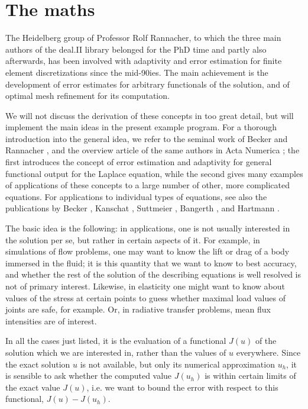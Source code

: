 \documentclass{article}
\begin{document}
\section{The maths}

The Heidelberg group of Professor Rolf Rannacher, to which the three main
authors of the deal.II library belonged for the PhD time and partly also
afterwards, has been involved with adaptivity and error estimation for finite
element discretizations since the mid-90ies. The main achievement is the
development of error estimates for arbitrary functionals of the solution, and
of optimal mesh refinement for its computation.

We will not discuss the derivation of these concepts in too great detail, but
will implement the main ideas in the present example program. For a thorough
introduction into the general idea, we refer to the seminal work of Becker and
Rannacher \cite{BR95,BR96r}, and the overview article of the same authors in
Acta Numerica \cite{BR01}; the first introduces the concept of error
estimation and adaptivity for general functional output for the Laplace
equation, while the second gives many examples of applications of these
concepts to a large number of other, more complicated equations. For
applications to individual types of equations, see also the publications by
Becker \cite{Bec95,Bec98}, Kanschat \cite{Kan96,FK97}, Suttmeier
\cite{Sut96,RS97,RS98c,RS99}, Bangerth \cite{BR99b,Ban00w,BR01a,Ban02}, and
Hartmann \cite{HH01,HH01a,HH01b}.

The basic idea is the following: in applications, one is not usually
interested in the solution per se, but rather in certain aspects of it. For
example, in simulations of flow problems, one may want to know the lift or
drag of a body immersed in the fluid; it is this quantity that we want to know
to best accuracy, and whether the rest of the solution of the describing
equations is well resolved is not of primary interest. Likewise, in elasticity
one might want to know about values of the stress at certain points to guess
whether maximal load values of joints are safe, for example. Or, in radiative
transfer problems, mean flux intensities are of interest.

In all the cases just listed, it is the evaluation of a functional $J(u)$ of
the solution which we are interested in, rather than the values of $u$
everywhere. Since the exact solution $u$ is not available, but only its
numerical approximation $u_h$, it is sensible to ask whether the computed
value $J(u_h)$ is within certain limits of the exact value $J(u)$, i.e. we
want to bound the error with respect to this functional, $J(u)-J(u_h)$.
\end{document}
